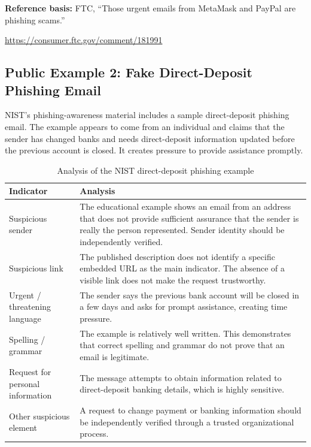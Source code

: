 \documentclass[12pt,a4paper]{article}
\newcommand{\referenceblock}[2]{%
\begin{samepage}
\noindent\textbf{Reference basis:} #1\par
\smallskip
\noindent\url{#2}\par
\end{samepage}
\par\vspace{0.25cm}
}
\begin{document}
\referenceblock{FTC, ``Those urgent emails from MetaMask and PayPal are phishing scams.''}{https://consumer.ftc.gov/comment/181991}

\subsection{Public Example 2: Fake Direct-Deposit Phishing Email}

NIST's phishing-awareness material includes a sample direct-deposit
phishing email. The example appears to come from an individual and
claims that the sender has changed banks and needs direct-deposit
information updated before the previous account is closed. It creates
pressure to provide assistance promptly.

\begin{table}[H]
\centering
\small
\renewcommand{\arraystretch}{1.35}
\begin{tabular}{|p{4.0cm}|p{9.2cm}|}
\hline
\textbf{Indicator} & \textbf{Analysis}\\
\hline
Suspicious sender & The educational example shows an email from an address that does not provide sufficient assurance that the sender is really the person represented. Sender identity should be independently verified.\\
\hline
Suspicious link & The published description does not identify a specific embedded URL as the main indicator. The absence of a visible link does not make the request trustworthy.\\
\hline
Urgent / threatening language & The sender says the previous bank account will be closed in a few days and asks for prompt assistance, creating time pressure.\\
\hline
Spelling / grammar & The example is relatively well written. This demonstrates that correct spelling and grammar do not prove that an email is legitimate.\\
\hline
Request for personal information & The message attempts to obtain information related to direct-deposit banking details, which is highly sensitive.\\
\hline
Other suspicious element & A request to change payment or banking information should be independently verified through a trusted organizational process.\\
\hline
\end{tabular}
\caption{Analysis of the NIST direct-deposit phishing example}
\label{tab:direct-deposit-analysis}
\end{table}
\end{document}
